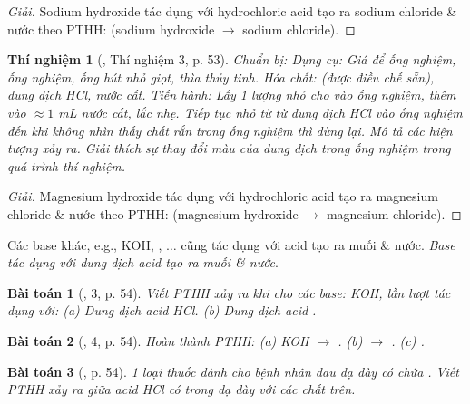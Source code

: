 \documentclass{article}
\newtheorem{baitoan}{Bài toán}
\newtheorem{thinghiem}{Thí nghiệm}
\begin{document}
\begin{proof}[Giải]
	Sodium hydroxide tác dụng với hydrochloric acid tạo ra sodium chloride \& nước theo PTHH:  (sodium hydroxide $\to$ sodium chloride).
\end{proof}

\begin{thinghiem}[\cite{SGK_KHTN_8_Canh_Dieu}, Thí nghiệm 3, p. 53]
	\emph{Chuẩn bị:} Dụng cụ: Giá để ống nghiệm, ống nghiệm, ống hút nhỏ giọt, thìa thủy tinh. Hóa chất: \emph{} (được điều chế sẵn), dung dịch \emph{HCl}, nước cất. \emph{Tiến hành:} Lấy 1 lượng nhỏ \emph{} cho vào ống nghiệm, thêm vào $\approx1$ \emph{mL} nước cất, lắc nhẹ. Tiếp tục nhỏ từ từ dung dịch \emph{HCl} vào ống nghiệm đến khi không nhìn thấy chất rắn trong ống nghiệm thì dừng lại. Mô tả các hiện tượng xảy ra. Giải thích sự thay đổi màu của dung dịch trong ống nghiệm trong quá trình thí nghiệm.
\end{thinghiem}

\begin{proof}[Giải]
	Magnesium hydroxide tác dụng với hydrochloric acid tạo ra magnesium chloride \& nước theo PTHH:  (magnesium hydroxide $\to$ magnesium chloride).
\end{proof}
Các base khác, e.g., KOH, , $\ldots$ cũng tác dụng với acid tạo ra muối \& nước. \textit{Base tác dụng với dung dịch acid tạo ra muối \& nước}.

\begin{baitoan}[\cite{SGK_KHTN_8_Canh_Dieu}, 3, p. 54]
	Viết PTHH xảy ra khi cho các base: \emph{KOH, } lần lượt tác dụng với: (a) Dung dịch acid \emph{HCl}. (b) Dung dịch acid \emph{}.
\end{baitoan}

\begin{baitoan}[\cite{SGK_KHTN_8_Canh_Dieu}, 4, p. 54]
	Hoàn thành PTHH: (a) \emph{KOH $\to$ }. (b) \emph{ $\to$ }. (c) \emph{}.
\end{baitoan}

\begin{baitoan}[\cite{SGK_KHTN_8_Canh_Dieu}, p. 54]
	1 loại thuốc dành cho bệnh nhân đau dạ dày có chứa \emph{}. Viết PTHH xảy ra giữa acid \emph{HCl} có trong dạ dày với các chất trên.
\end{baitoan}
\end{document}
